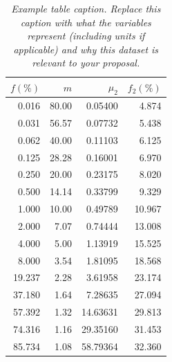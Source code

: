 \documentclass[12pt,openany,a4paper]{book}
\newcommand{\purple}[1]{\textcolor{topicpurple}{\textit{#1}}}
\begin{document}
\begin{table}[htbp]
    
  \centering
  \caption{\purple{Example table caption. Replace this caption with what the variables represent (including units if applicable) and why this dataset is relevant to your proposal.}}
  \label{tab:example-data}
  \renewcommand{\arraystretch}{1.15}
  \begin{tabular}{r r r r}
    \hline
    $f(\%)$ & $m$ & $\mu_2$ & $f_2(\%)$ \\
    \hline
    0.016  & 80.00 & 0.05400  & 4.874 \\
    0.031  & 56.57 & 0.07732  & 5.438 \\
    0.062  & 40.00 & 0.11103  & 6.125 \\
    0.125  & 28.28 & 0.16001  & 6.970 \\
    0.250  & 20.00 & 0.23175  & 8.020 \\
    0.500  & 14.14 & 0.33799  & 9.329 \\
    1.000  & 10.00 & 0.49789  & 10.967 \\
    2.000  & 7.07  & 0.74444  & 13.008 \\
    4.000  & 5.00  & 1.13919  & 15.525 \\
    8.000  & 3.54  & 1.81095  & 18.568 \\
    \hline
    19.237 & 2.28  & 3.61958  & 23.174 \\
    37.180 & 1.64  & 7.28635  & 27.094 \\
    57.392 & 1.32  & 14.63631 & 29.813 \\
    74.316 & 1.16  & 29.35160 & 31.453 \\
    85.734 & 1.08  & 58.79364 & 32.360 \\
    \hline
  \end{tabular}
\end{table}



\end{document}
